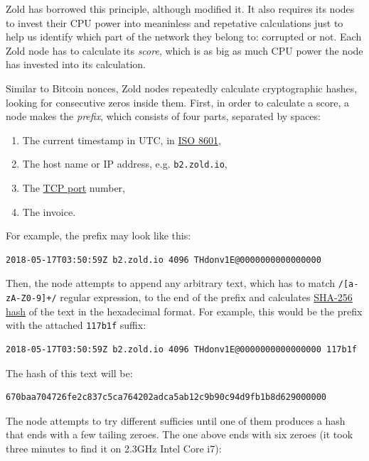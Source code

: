 \documentclass[11pt,oneside]{article}
\newcommand\dd[1]{\colorbox{gray!30}{\texttt{#1}}}
\begin{document}
Zold has borrowed this principle, although modified it. It also requires
its nodes to invest their CPU power into meaninless and repetative
calculations just to help us identify which part of the network they belong to:
corrupted or not. Each Zold node has to calculate its \emph{score},
which is as big as much CPU power the node has invested into its calculation.

Similar to Bitcoin nonces, Zold nodes repeatedly calculate cryptographic hashes,
looking for consecutive zeros inside them. First, in order to calculate a score,
a node makes the \emph{prefix}, which consists of four parts,
separated by spaces:

\begin{enumerate}
\item The current timestamp in UTC, in \href{https://en.wikipedia.org/wiki/ISO_8601}{ISO 8601},
\item The host name or IP address, e.g. \dd{b2.zold.io},
\item The \href{https://en.wikipedia.org/wiki/Port_(computer_networking)}{TCP port} number,
\item The invoice.
\end{enumerate}

For example, the prefix may look like this:

\begin{verbatim}
2018-05-17T03:50:59Z b2.zold.io 4096 THdonv1E@0000000000000000
\end{verbatim}

Then, the node attempts to append any arbitrary text, which has to match
\dd{/[a-zA-Z0-9]+/} regular expression, to the end of the prefix and calculates
\href{https://en.wikipedia.org/wiki/SHA-2}{SHA-256 hash}
of the text in the hexadecimal format. For example, this would be the prefix
with the attached \dd{117b1f} suffix:

\begin{verbatim}
2018-05-17T03:50:59Z b2.zold.io 4096 THdonv1E@0000000000000000 117b1f
\end{verbatim}

The hash of this text will be:

\begin{verbatim}
670baa704726fe2c837c5ca764202adca5ab12c9b90c94d9fb1b8d629000000
\end{verbatim}

The node attempts to try different sufficies until one of them produces
a hash that ends with a few tailing zeroes. The one above ends
with six zeroes
(it took three minutes to find it on 2.3GHz Intel Core i7):
\end{document}
